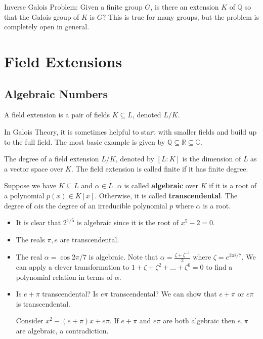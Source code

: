 \documentclass[11pt]{scrartcl}
\newcommand{\Q}{\mathbb{Q}}
\newcommand{\R}{\mathbb{R}}
\newcommand{\C}{\mathbb C}
\begin{document}
Inverse Galois Problem: Given a finite group $G$, is there an extension $K$ of $\Q$ so that the Galois group of $K$ is $G$?  This is true for many groups, but the problem is completely open in general.
\pagebreak
\section{Field Extensions}
\subsection{Algebraic Numbers}
\begin{definition} A field extension is a pair of fields $K \subseteq L$, denoted $L/K$.
\end{definition}
In Galois Theory, it is sometimes helpful to start with smaller fields and build up to the full field.
The most basic example is given by $\Q \subseteq \R \subseteq \C$.

The degree of a field extension $L/K$, denoted by $[L:K]$  is the dimension of $L$ as a vector space over $K$.  The field extension is called finite if it has finite degree.

\begin{definition}
Suppose we have $K \subseteq L$ and $\alpha \in L$.   $\alpha$ is called \textbf{algebraic} over $K$ if it is a root of a polynomial $p(x) \in K[x]$.  Otherwise, it is called  \textbf{transcendental}.  The degree of $\alpha$is the degree of an irreducible polynomial $p$ where $\alpha$ is a root.
\end{definition}
\begin{itemize}
\item It is clear that $2^{1/5}$ is algebraic since it is the root of $x^5 - 2 = 0$.  
\item The reals $\pi, e$ are transcendental.  
\item The real $\alpha = \cos{2\pi/7}$ is algebraic.   Note that $\alpha = \frac{\zeta + \zeta^{-1}}{2}$ where $\zeta = e^{2\pi i/7}$.  We can apply a clever transformation to $1 + \zeta + \zeta^2 + \dots + \zeta^6 = 0$ to find a polynomial relation in terms of $\alpha$.
\item Is $e + \pi$ transcendental?  Is $e \pi$ transcendental?  We can show that $e + \pi$ or $e\pi$ is transcendental.

Consider $x^2 - (e + \pi)x + e\pi$.  If $e + \pi$ and $e \pi$ are both algebraic then $e, \pi$ are algebraic, a contradiction.
\end{itemize}
\end{document}
